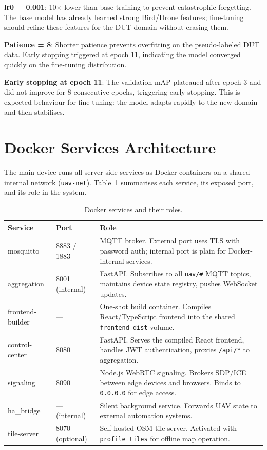 \documentclass[12pt,a4paper]{report}
\begin{document}
\textbf{lr0 = 0.001}: 10$\times$ lower than base training to prevent
catastrophic forgetting. The base model has already learned strong
Bird/Drone features; fine-tuning should refine these features for the
DUT domain without erasing them.

\textbf{Patience = 8}: Shorter patience prevents overfitting on the
pseudo-labeled DUT data. Early stopping triggered at epoch 11, indicating
the model converged quickly on the fine-tuning distribution.

\textbf{Early stopping at epoch 11}: The validation mAP plateaued after
epoch 3 and did not improve for 8 consecutive epochs, triggering early
stopping. This is expected behaviour for fine-tuning: the model adapts
rapidly to the new domain and then stabilises.

\section{Docker Services Architecture}

The main device runs all server-side services as Docker containers on a shared
internal network (\texttt{uav-net}). Table~\ref{tab:docker_services} summarises
each service, its exposed port, and its role in the system.

\begin{table}[H]
\centering
\caption{Docker services and their roles.}
\label{tab:docker_services}
\begin{tabular}{|l|l|p{7.5cm}|}
\hline
\textbf{Service} & \textbf{Port} & \textbf{Role} \\
\hline
mosquitto & 8883 / 1883 & MQTT broker. External port uses TLS with password auth; internal port is plain for Docker-internal services. \\
\hline
aggregation & 8001 (internal) & FastAPI. Subscribes to all \texttt{uav/\#} MQTT topics, maintains device state registry, pushes WebSocket updates. \\
\hline
frontend-builder & — & One-shot build container. Compiles React/TypeScript frontend into the shared \texttt{frontend-dist} volume. \\
\hline
control-center & 8080 & FastAPI. Serves the compiled React frontend, handles JWT authentication, proxies \texttt{/api/*} to aggregation. \\
\hline
signaling & 8090 & Node.js WebRTC signaling. Brokers SDP/ICE between edge devices and browsers. Binds to \texttt{0.0.0.0} for edge access. \\
\hline
ha\_bridge & — (internal) & Silent background service. Forwards UAV state to external automation systems. \\
\hline
tile-server & 8070 (optional) & Self-hosted OSM tile server. Activated with \texttt{--profile tiles} for offline map operation. \\
\hline
\end{tabular}
\end{table}
\end{document}
